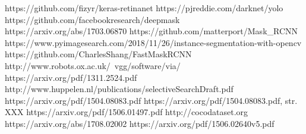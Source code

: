 \begin{thebibliography}{20}%



 https://github.com/fizyr/keras-retinanet
 https://pjreddie.com/darknet/yolo
 https://github.com/facebookresearch/deepmask
 https://arxiv.org/abs/1703.06870
 https://github.com/matterport/Mask\_RCNN
 https://www.pyimagesearch.com/2018/11/26/instance-segmentation-with-opencv
 https://github.com/CharlesShang/FastMaskRCNN
 http://www.robots.ox.ac.uk/~vgg/software/via/
 https://arxiv.org/pdf/1311.2524.pdf
 http://www.huppelen.nl/publications/selectiveSearchDraft.pdf
 https://arxiv.org/pdf/1504.08083.pdf
 https://arxiv.org/pdf/1504.08083.pdf, str. XXX
 https://arxiv.org/pdf/1506.01497.pdf
 http://cocodataset.org
 https://arxiv.org/abs/1708.02002
 https://arxiv.org/pdf/1506.02640v5.pdf

\end{thebibliography}

